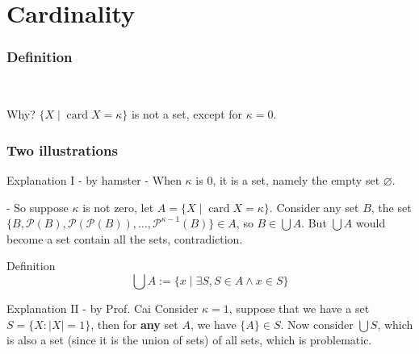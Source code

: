 \documentclass{beamer}
\begin{document}
\section{Cardinality}
\begin{frame}
    \frametitle{Definition}
    \\\vv 
    \begin{block}{Why?}
        \hh $\{X \mid \operatorname{card} X =\kappa \}$ is not a set, except for $\kappa = 0$.
    \end{block}
\end{frame}
\begin{frame}
    \frametitle{Two illustrations}

    \begin{block}{Explanation I - by hamster}
        \hh 
        - When $\kappa$ is 0, it is a set, namely the empty set $\varnothing$. \par 
        \hh - So suppose $\kappa$ is not zero, let $A = \{X \mid \operatorname{card} X = \kappa \}$.
        Consider any set $B$, the set $\{ B,\mathcal{P}(B), \mathcal{P}(\mathcal{P} (B)),\dots, \mathcal{P}^{\kappa-1}(B)\} \in A$,
        so $B \in \bigcup A $. But $\bigcup A$ would become a set contain all the sets, contradiction.
    \end{block}
    
    \begin{block}{Definition}
        $$\bigcup A := \{ x \mid \exists S, S \in A \wedge x \in S\}$$
    \end{block}
    \begin{block}{Explanation II - by Prof. Cai}
        \hh
        Consider $\kappa=1$, suppose that we have a set $S=\{X: \lvert X\rvert=1\}$, 
        then for \textbf{any} set $A$, we have $\{A\}\in S$. Now consider $\bigcup S$, 
        which is also a set (since it is the union of sets) of all sets, which is problematic.
    \end{block}
\end{frame}
\end{document}
